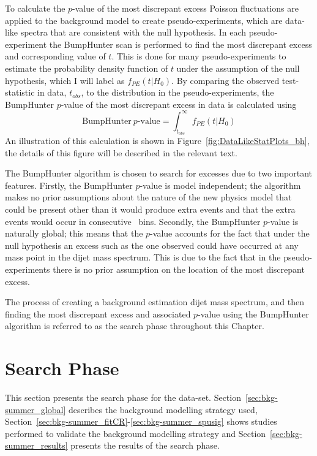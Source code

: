 To calculate the \mbox{$p$-value} of the most discrepant excess
Poisson fluctuations are applied to the background model to create pseudo-experiments,
which are data-like spectra that are consistent with the null hypothesis.
In each pseudo-experiment the BumpHunter scan is performed to find the most discrepant excess and corresponding value of $t$.
This is done for many pseudo-experiments to estimate the probability density function of $t$ under the assumption of the null hypothesis,
which I will label as $f_{PE}(t| H_0)$.
By comparing the observed test-statistic in data, $t_{obs}$,
to the distribution in the pseudo-experiments,
the BumpHunter \mbox{$p$-value} of the most discrepant excess in data is calculated using
\begin{equation}
  \text{BumpHunter}~p\text{-value} = \int_{t_{obs}}^\infty f_{PE}(t | H_0)
\end{equation}
An illustration of this calculation is shown in Figure~\ref{fig:DataLikeStatPlots_bh},
the details of this figure will be described in the relevant text.


The BumpHunter algorithm is chosen to search for excesses due to two important features.
Firstly, the BumpHunter \mbox{$p$-value} is model independent;
the algorithm makes no prior assumptions about the nature of the new physics model that could be present
other than it would produce extra events and that the extra events would occur in consecutive~\mjj{} bins.
Secondly, the BumpHunter \mbox{$p$-value} is naturally global;
this means that the \mbox{$p$-value} accounts for the fact that under the null hypothesis an excess such as the one observed could have occurred at any mass point in the dijet mass spectrum.
This is due to the fact that in the pseudo-experiments there is no prior assumption on the location of the most discrepant excess.

The process of creating a background estimation dijet mass spectrum,
and then finding the most discrepant excess and associated $p$-value using the BumpHunter algorithm
is referred to as the search phase throughout this Chapter.

\section{\summer{} Search Phase}
\label{sec:bkg-summer}

This section presents the search phase for the \summer{} data-set.
Section~\ref{sec:bkg-summer_global} describes the background modelling strategy used,
Section~\ref{sec:bkg-summer_fitCR}-\ref{sec:bkg-summer_spusig}
shows studies performed to validate the background modelling strategy
and Section~\ref{sec:bkg-summer_results} presents the results of the search phase.

